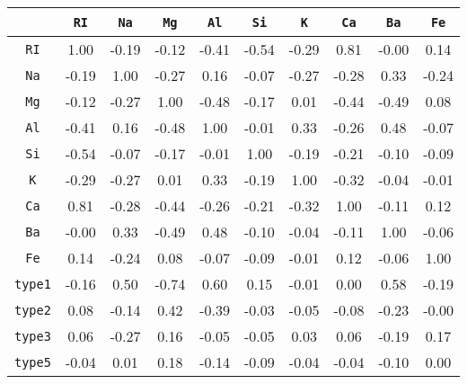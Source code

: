 

\begin{table}[H]

    
    \centering
    \begin{tabular}{c||c c c c c c c c c}

~ & \texttt{RI} & \texttt{Na} & \texttt{Mg} & \texttt{Al} & \texttt{Si} & \texttt{K} & \texttt{Ca} & \texttt{Ba} & \texttt{Fe} \\ \hline \hline

\texttt{RI} & 1.00 & -0.19 & -0.12 & -0.41 & -0.54 & -0.29 & 0.81 & -0.00 & 0.14 \\


\texttt{Na} & -0.19 & 1.00 & -0.27 & 0.16 & -0.07 & -0.27 & -0.28 & 0.33 & -0.24 \\

\texttt{Mg} & -0.12 & -0.27 & 1.00 & -0.48 & -0.17 & 0.01 & -0.44 & -0.49 & 0.08 \\


\texttt{Al} & -0.41 & 0.16 & -0.48 & 1.00 & -0.01 & 0.33 & -0.26 & 0.48 & -0.07 \\


\texttt{Si} & -0.54 & -0.07 & -0.17 & -0.01 & 1.00 & -0.19 & -0.21 & -0.10 & -0.09 \\


\texttt{K} & -0.29 & -0.27 & 0.01 & 0.33 & -0.19 & 1.00 & -0.32 & -0.04 & -0.01 \\


\texttt{Ca} & 0.81 & -0.28 & -0.44 & -0.26 & -0.21 & -0.32 & 1.00 & -0.11 & 0.12 \\


\texttt{Ba} & -0.00 & 0.33 & -0.49 & 0.48 & -0.10 & -0.04 & -0.11 & 1.00 & -0.06 \\


\texttt{Fe} & 0.14 & -0.24 & 0.08 & -0.07 & -0.09 & -0.01 & 0.12 & -0.06 & 1.00 \\ \hline


\texttt{type1}  & -0.16 & 0.50 & -0.74 & 0.60 & 0.15 & -0.01 & 0.00 & 0.58 & -0.19 \\


\texttt{type2} & 0.08 & -0.14 & 0.42 & -0.39 & -0.03 & -0.05 & -0.08 & -0.23 & -0.00 \\


\texttt{type3} & 0.06 & -0.27 & 0.16 & -0.05 & -0.05 & 0.03 & 0.06 & -0.19 & 0.17 \\


\texttt{type5} & -0.04 & 0.01 & 0.18 & -0.14 & -0.09 & -0.04 & -0.04 & -0.10 & 0.00 \\



\end{tabular}
\end{table}
